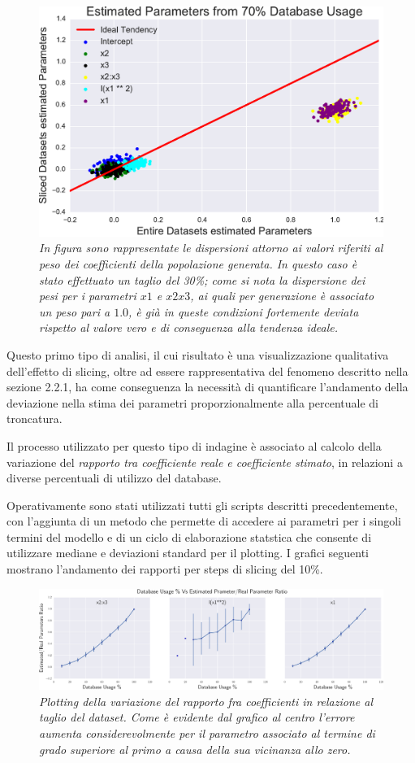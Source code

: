 \documentclass[12pt,openright,twoside,a4paper]{book}
\begin{document}
\begin{figure}[!h]
\centering
\includegraphics[width=0.55\linewidth]{coeffscatter70}
\caption{\textit{In figura sono rappresentate le dispersioni attorno ai valori riferiti al peso dei coefficienti della popolazione generata. 
In questo caso è stato effettuato un taglio del 30\%; come si nota la dispersione dei pesi per i parametri $x1$ e $x2x3$, ai quali per generazione è associato un peso pari a $1.0$, è già in queste condizioni fortemente deviata rispetto al valore vero e di conseguenza alla tendenza ideale.}}
\label{coeffscatter70}
\end{figure}

Questo primo tipo di analisi, il cui risultato è una visualizzazione qualitativa dell'effetto di slicing, oltre ad essere rappresentativa del fenomeno descritto nella sezione 2.2.1, ha come conseguenza la necessità di quantificare l'andamento della deviazione nella stima dei parametri proporzionalmente alla percentuale di troncatura.

Il processo utilizzato per  questo tipo di indagine è associato al calcolo della variazione del \textit{rapporto tra coefficiente reale e coefficiente stimato}, in relazioni a diverse percentuali di utilizzo del database.

Operativamente sono stati utilizzati tutti gli scripts descritti precedentemente, con l'aggiunta di un metodo che permette di accedere ai parametri per i singoli termini del modello e di un ciclo di elaborazione statstica che consente  di utilizzare mediane e deviazioni standard per il plotting.
I grafici seguenti mostrano l'andamento dei rapporti per steps di slicing del 10\%.

\begin{figure}[!h]
\centering
\includegraphics[width=1.0\linewidth]{finalgraph}
\caption{\textit{Plotting della variazione del rapporto fra coefficienti in relazione al taglio del dataset. Come è evidente dal grafico al centro l'errore aumenta considerevolmente per il parametro associato al termine di grado superiore al primo a causa della sua vicinanza allo zero.}}
\label{finalgraph}
\end{figure}
\end{document}
